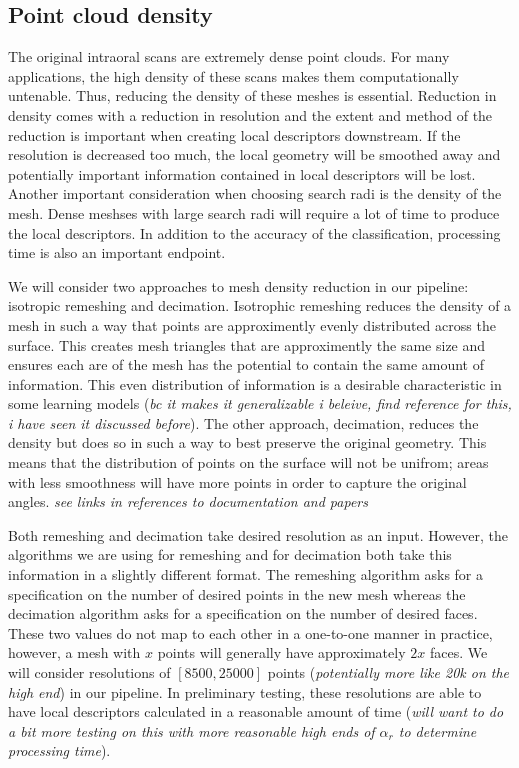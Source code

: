 \documentclass[11pt]{article}
\theoremstyle{definition}
\begin{document}
\subsection{Point cloud density}

The original intraoral scans are extremely dense point clouds. For many applications, the high density of these scans makes them computationally untenable. Thus, reducing the density of these meshes is essential. Reduction in density comes with a reduction in resolution and the extent and method of the reduction is important when creating local descriptors downstream. If the resolution is decreased too much, the local geometry will be smoothed away and potentially important information contained in local descriptors will be lost. Another important consideration when choosing search radi is the density of the mesh. Dense meshses with large search radi will require a lot of time to produce the local descriptors. In addition to the accuracy of the classification, processing time is also an important endpoint.

We will consider two approaches to mesh density reduction in our pipeline: isotropic remeshing and decimation. Isotrophic remeshing reduces the density of a mesh in such a way that points are approximently evenly distributed across the surface. This creates mesh triangles that are approximently the same size and ensures each are of the mesh has the potential to contain the same amount of information. This even distribution of information is a desirable characteristic in some learning models (\textit{bc it makes it generalizable i beleive, find reference for this, i have seen it discussed before}). The other approach, decimation, reduces the density but does so in such a way to best preserve the original geometry. This means that the distribution of points on the surface will not be unifrom; areas with less smoothness will have more points in order to capture the original angles. \textit{see links in references to documentation and papers} 

Both remeshing and decimation take desired resolution as an input. However, the algorithms we are using for remeshing and for decimation both take this information in a slightly different format. The remeshing algorithm asks for a specification on the number of desired points in the new mesh whereas the decimation algorithm asks for a specification on the number of desired faces. These two values do not map to each other in a one-to-one manner in practice, however, a mesh with $x$ points will generally have approximately $2x$ faces. We will consider resolutions of $[8500, 25000]$ points (\textit{potentially more like 20k on the high end}) in our pipeline. In preliminary testing, these resolutions are able to have local descriptors calculated in a reasonable amount of time (\textit{will want to do a bit more testing on this with more reasonable high ends of $\alpha_r$ to determine processing time}).
\end{document}
